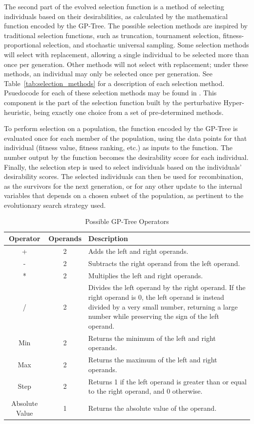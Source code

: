 \documentclass[sigconf]{acmart}
\begin{document}
The second part of the evolved selection function is a method of selecting individuals based on their desirabilities, as calculated by the mathematical function encoded by the GP-Tree. The possible selection methods are inspired by traditional selection functions, such as truncation, tournament selection, fitness-proportional selection, and stochastic universal sampling. Some selection methods will select with replacement, allowing a single individual to be selected more than once per generation. Other methods will not select with replacement; under these methods, an individual may only be selected once per generation. See Table~\ref{tab:selection_methods} for a description of each selection method. Psuedocode for each of these selection methods may be found in \citep{richter2019thesis}. This component is the part of the selection function built by the perturbative Hyper-heuristic, being exactly one choice from a set of pre-determined methods.

To perform selection on a population, the function encoded by the GP-Tree is evaluated once for each member of the population, using the data points for that individual (fitness value, fitness ranking, etc.) as inputs to the function. The number output by the function becomes the desirability score for each individual. Finally, the selection step is used to select individuals based on the individuals' desirability scores. The selected individuals can then be used for recombination, as the survivors for the next generation, or for any other update to the internal variables that depends on a chosen subset of the population, as pertinent to the evolutionary search strategy used.

\begin{table}
	\centering
	\caption{Possible GP-Tree Operators}
	\label{tab:gp-operators}
	\begin{tabular}{cc|p{4.5cm}}
		\toprule
		Operator & Operands & Description\\
		\midrule
		+ & 2 & Adds the left and right operands. \\
		\hline
		- & 2 & Subtracts the right operand from the left operand.\\    
		\hline
		* & 2 & Multiplies the left and right operands.\\  
		\hline
		/ & 2 & Divides the left operand by the right operand. If the right operand is 0, the left operand is instead divided by a very small number, returning a large number while preserving the sign of the left operand.\\      
		\hline
		Min & 2 & Returns the minimum of the left and right operands.\\
		\hline
		Max & 2 & Returns the maximum of the left and right operands.\\
		\hline
		Step & 2 & Returns 1 if the left operand is greater than or equal to the right operand, and 0 otherwise.\\
		\hline
		Absolute Value & 1 & Returns the absolute value of the operand.\\    
		
		\bottomrule
	\end{tabular}
\end{table}
\end{document}
